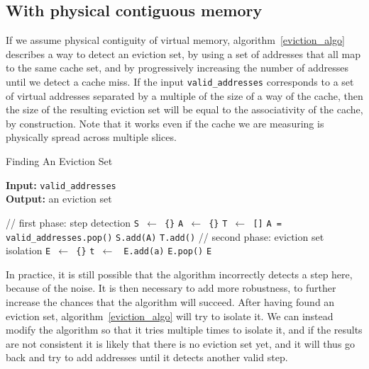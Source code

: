 \documentclass[a4paper,11pt,oneside]{report}
\begin{document}
\subsection{With physical contiguous memory}

If we assume physical contiguity of virtual memory, algorithm~\ref{eviction_algo} describes a way to detect an eviction set, by using a set of addresses that all map to the same cache set, and by progressively increasing the number of addresses until we detect a cache miss. If the input \texttt{valid\_addresses} corresponds to a set of virtual addresses separated by a multiple of the size of a way of the cache, then the size of the resulting eviction set will be equal to the associativity of the cache, by construction. Note that it works even if the cache we are measuring is physically spread across multiple slices.

\begin{algorithm}
\caption{Finding An Eviction Set}\label{eviction_algo}
\hspace*{\algorithmicindent} \textbf{Input:} \texttt{valid\_addresses}\\
\hspace*{\algorithmicindent} \textbf{Output:} an eviction set
\begin{algorithmic}[1]
\State \textcolor{CommentGray}{// first phase: step detection}
\State \texttt{S $\gets$ \{\}} 
\State \texttt{A $\gets$ \{\}} 
\State \texttt{T $\gets$ []}
\State \texttt{A = valid\_addresses.pop()}
\State \texttt{S.add(A)}
\State \texttt{T.add()}
\EndWhile
\State
\State \textcolor{CommentGray}{// second phase: eviction set isolation}
\State \texttt{E $\gets$ \{\}} 
\State \texttt{t $\gets$ }
\State \texttt{E.add(a)}
\EndIf
\EndFor
\State \texttt{E.pop()}
\State \Return \texttt{E}
\EndProcedure
\end{algorithmic}
\end{algorithm}

In practice, it is still possible that the algorithm incorrectly detects a step here, because of the noise. It is then necessary to add more robustness, to further increase the chances that the algorithm will succeed. After having found an eviction set, algorithm~\ref{eviction_algo} will try to isolate it. We can instead modify the algorithm so that it tries multiple times to isolate it, and if the results are not consistent it is likely that there is no eviction set yet, and it will thus go back and try to add addresses until it detects another valid step.
\end{document}
